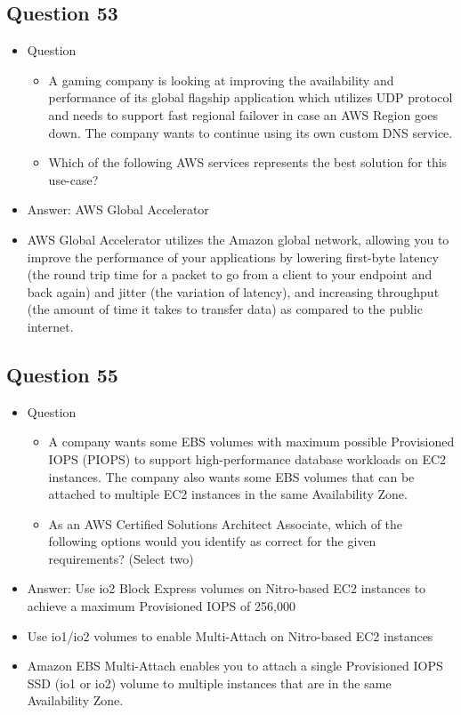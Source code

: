 \documentclass[]{scrartcl}
\begin{document}
\subsection{Question 53}
\begin{itemize}
	\item Question
	\begin{itemize}
		\item A gaming company is looking at improving the availability and performance of its global flagship application which utilizes UDP protocol and needs to support fast regional failover in case an AWS Region goes down. The company wants to continue using its own custom DNS service.
		\item Which of the following AWS services represents the best solution for this use-case?
	\end{itemize}
	\item Answer: AWS Global Accelerator
	\item AWS Global Accelerator utilizes the Amazon global network, allowing you to improve the performance of your applications by lowering first-byte latency (the round trip time for a packet to go from a client to your endpoint and back again) and jitter (the variation of latency), and increasing throughput (the amount of time it takes to transfer data) as compared to the public internet.
\end{itemize}

\subsection{Question 55}
\begin{itemize}
	\item Question
	\begin{itemize}
		\item A company wants some EBS volumes with maximum possible Provisioned IOPS (PIOPS) to support high-performance database workloads on EC2 instances. The company also wants some EBS volumes that can be attached to multiple EC2 instances in the same Availability Zone.
		\item As an AWS Certified Solutions Architect Associate, which of the following options would you identify as correct for the given requirements? (Select two)
	\end{itemize}
	\item Answer: Use io2 Block Express volumes on Nitro-based EC2 instances to achieve a maximum Provisioned IOPS of 256,000
	\item Use io1/io2 volumes to enable Multi-Attach on Nitro-based EC2 instances
	\item Amazon EBS Multi-Attach enables you to attach a single Provisioned IOPS SSD (io1 or io2) volume to multiple instances that are in the same Availability Zone.
\end{itemize}
\end{document}
